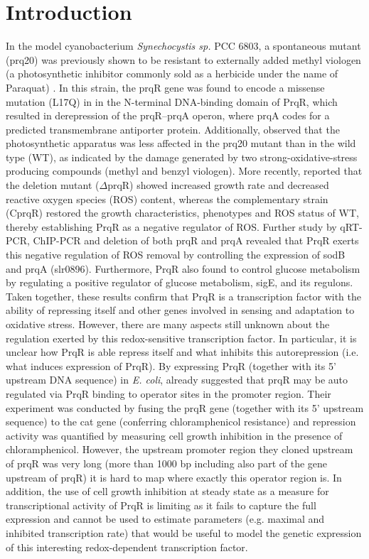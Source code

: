 \section*{Introduction}
In the model cyanobacterium \textit{Synechocystis sp.} PCC 6803, a spontaneous mutant (prq20) was previously shown to be resistant to externally added methyl viologen (a photosynthetic inhibitor commonly sold as a herbicide under the name of Paraquat) \citep{Kirik2003}. 
In this strain, the prqR gene was found to encode a missense mutation (L17Q) in in the N-terminal DNA-binding domain of PrqR, which resulted in derepression of the prqR–prqA operon, where prqA codes for a predicted transmembrane antiporter protein.
Additionally, \cite{Kreslavski2007} observed that the photosynthetic apparatus was less affected in the prq20 mutant than in the wild type (WT), as indicated by the damage generated by two strong-oxidative-stress producing compounds (methyl and benzyl viologen).
More recently, \cite {Khan2016} reported that the deletion mutant ($\Delta$prqR) showed increased growth rate and decreased reactive oxygen species (ROS) content, whereas the complementary strain (CprqR) restored the growth characteristics, phenotypes and ROS status of WT, thereby establishing PrqR as a negative regulator of ROS. Further study by qRT-PCR, ChIP-PCR and deletion of both prqR and prqA revealed that PrqR exerts this negative regulation of ROS removal by controlling the expression of sodB and prqA (slr0896). Furthermore, PrqR also found to control glucose metabolism by regulating a positive regulator of glucose metabolism, sigE, and its regulons.
Taken together, these results confirm that PrqR is a transcription factor with the ability of repressing itself and other genes involved in sensing and adaptation to oxidative stress. However, there are many aspects still unknown about the regulation exerted by this redox-sensitive transcription factor.
In particular, it is unclear how PrqR is able repress itself and what inhibits this autorepression (i.e. what induces expression of PrqR).
By expressing PrqR (together with its 5' upstream DNA sequence) in \textit{E. coli}, \cite{Kirik2003} already suggested that prqR may be auto regulated via PrqR binding to operator sites in the promoter region. Their experiment was conducted by fusing the prqR gene (together with its 5' upstream sequence) to the cat gene (conferring chloramphenicol resistance) and repression activity was quantified by measuring cell growth inhibition in the presence of chloramphenicol. However, the upstream promoter region they cloned upstream of prqR was very long (more than 1000 bp including also part of the gene upstream of prqR) it is hard to map where exactly this operator region is. In addition, the use of cell growth inhibition at steady state as a measure for transcriptional activity of PrqR is limiting as it fails to capture the full expression and cannot be used to estimate parameters (e.g. maximal and inhibited transcription rate) that would be useful to model the genetic expression of this interesting redox-dependent transcription factor.
